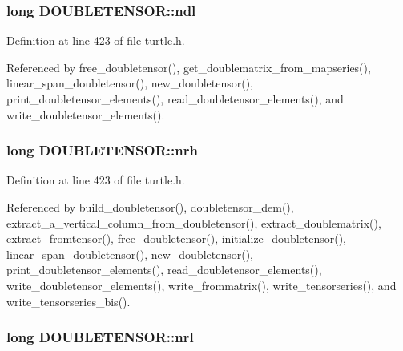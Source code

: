 \hypertarget{struct_d_o_u_b_l_e_t_e_n_s_o_r_a70f655fffb0694e9cc4f63c54c0fead6}{
\subsubsection[{ndl}]{\setlength{\rightskip}{0pt plus 5cm}long D\-O\-U\-B\-L\-E\-T\-E\-N\-S\-O\-R\-::ndl}}\label{struct_d_o_u_b_l_e_t_e_n_s_o_r_a70f655fffb0694e9cc4f63c54c0fead6}


Definition at line 423 of file turtle.\-h.



Referenced by free\-\_\-doubletensor(), get\-\_\-doublematrix\-\_\-from\-\_\-mapseries(), linear\-\_\-span\-\_\-doubletensor(), new\-\_\-doubletensor(), print\-\_\-doubletensor\-\_\-elements(), read\-\_\-doubletensor\-\_\-elements(), and write\-\_\-doubletensor\-\_\-elements().

\hypertarget{struct_d_o_u_b_l_e_t_e_n_s_o_r_af053133b77c45040387cfd381c88e54b}{
\subsubsection[{nrh}]{\setlength{\rightskip}{0pt plus 5cm}long D\-O\-U\-B\-L\-E\-T\-E\-N\-S\-O\-R\-::nrh}}\label{struct_d_o_u_b_l_e_t_e_n_s_o_r_af053133b77c45040387cfd381c88e54b}


Definition at line 423 of file turtle.\-h.



Referenced by build\-\_\-doubletensor(), doubletensor\-\_\-dem(), extract\-\_\-a\-\_\-vertical\-\_\-column\-\_\-from\-\_\-doubletensor(), extract\-\_\-doublematrix(), extract\-\_\-fromtensor(), free\-\_\-doubletensor(), initialize\-\_\-doubletensor(), linear\-\_\-span\-\_\-doubletensor(), new\-\_\-doubletensor(), print\-\_\-doubletensor\-\_\-elements(), read\-\_\-doubletensor\-\_\-elements(), write\-\_\-doubletensor\-\_\-elements(), write\-\_\-frommatrix(), write\-\_\-tensorseries(), and write\-\_\-tensorseries\-\_\-bis().

\hypertarget{struct_d_o_u_b_l_e_t_e_n_s_o_r_ae087e4712109d06b6e44e5d7d4fbe9ea}{
\subsubsection[{nrl}]{\setlength{\rightskip}{0pt plus 5cm}long D\-O\-U\-B\-L\-E\-T\-E\-N\-S\-O\-R\-::nrl}}\label{struct_d_o_u_b_l_e_t_e_n_s_o_r_ae087e4712109d06b6e44e5d7d4fbe9ea}


